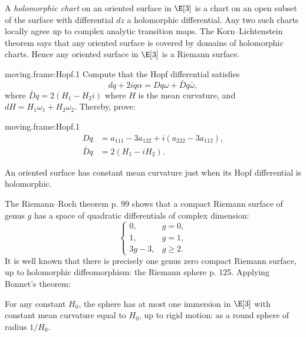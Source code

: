 A \emph{holomorphic chart} on an oriented surface in \(\E[3]\) is a chart on an open subset of the surface with differential \(dz\) a holomorphic differential.
Any two such charts locally agree up to complex analytic transition maps.
The Korn--Lichtenstein theorem says that any oriented surface is covered by domains of holomorphic charts.
Hence any oriented surface in \(\E[3]\) is a Riemann surface.
\begin{problem}{moving.frame:Hopf.1}
Compute that the Hopf differential satisfies
\[
dq+2iq\alpha = Dq \omega +  \bar{D}q \bar\omega,
\]
where
\(
\bar{D}q=
2(H_1-H_2i)
\)
where \(H\) is the mean curvature, and \(dH=H_1\omega_1+H_2\omega_2\).
Thereby, prove:
\end{problem}
\begin{answer}{moving.frame:Hopf.1}
\begin{align*}
Dq&=a_{111}-3a_{122}+i(a_{222}-3a_{112}),\\
\bar{D}q&=2(H_1-iH_2).
\end{align*}
\end{answer}
\begin{theorem}
An oriented surface has constant mean curvature just when its Hopf differential is holomorphic.
\end{theorem}
The Riemann--Roch theorem \cite{Griffiths:1989} p. 99 shows that a compact Riemann surface of genus \(g\) has a space of quadratic differentials of complex dimension: 
\[
\begin{cases}
0,&g=0,\\
1,&g=1,\\ 
3g-3,&g\ge 2.
\end{cases}
\]
It is well known that there is precisely one genus zero compact Riemann surface, up to holomorphic diffeomorphism: the Riemann sphere \cite{Griffiths:1989} p. 125.
Applying Bonnet's theorem:
\begin{corollary}
For any constant \(H_0\), the sphere has at most one immersion in \(\E[3]\) with constant mean curvature equal to \(H_0\), up to rigid motion: as a round sphere of radius \(1/H_0\).
\end{corollary}


